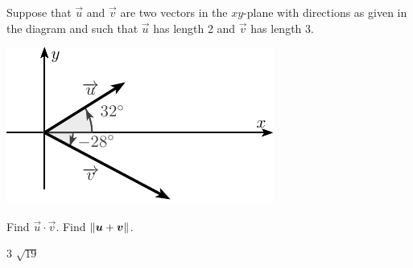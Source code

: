 
\begin{Exercise}[
name={},
title={}, 
difficulty=0,
origin={\cite{MH}}]
Suppose that $\vec u$ and $\vec v$ are two vectors in the $xy$-plane with directions as given in the diagram and such that $\vec u$ has length 2 and $\vec v$ has length 3.
\begin{minipage}[m]{\linewidth}
\centering
\includegraphics[width=\linewidth/2]{vector_geometry/dot_product_and_projections/figures/mh2}
\end{minipage}
\Question Find $\vec u\cdot\vec v$.
\Question Find $\lVert\bm{u}+\bm{v}\rVert$.
\end{Exercise}

\begin{Answer}
\Question $3$
\Question $\sqrt{19}$
\end{Answer}
